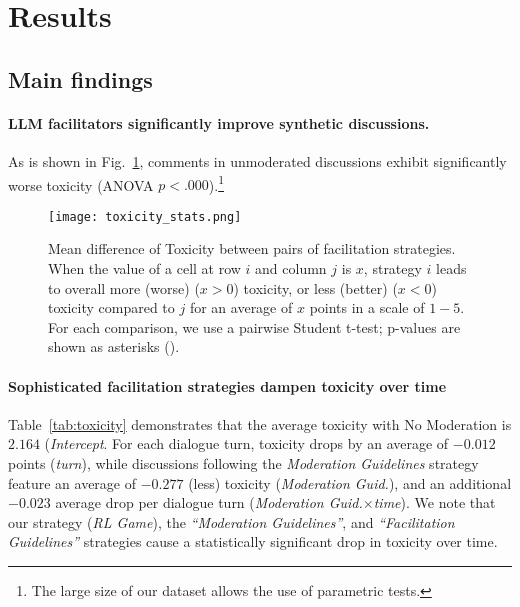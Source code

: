 %

\section{Results}
\label{sec:results}


\subsection{Main findings}

\paragraph{\ac{LLM} facilitators significantly improve synthetic discussions.} As is shown in Fig.~\ref{fig:toxicity_stats}, comments in unmoderated discussions exhibit significantly worse toxicity (ANOVA $p<.000$).\footnote{The large size of our dataset allows the use of parametric tests.} 

\begin{figure}
	\texttt{[image: toxicity\_stats.png]}
	\centering
	\caption{Mean difference of Toxicity between pairs of facilitation strategies. When the value of a cell at row $i$ and column $j$ is $x$, strategy $i$ leads to overall more (worse) ($x>0$) toxicity, or less (better) ($x<0$) toxicity compared to $j$ for an average of $x$ points in a scale of $1-5$. For each comparison, we use a pairwise Student t-test; p-values are shown as asterisks (\asterisknote).}
	\label{fig:toxicity_stats}
\end{figure}

\paragraph{Sophisticated facilitation strategies dampen toxicity over time} Table~\ref{tab:toxicity} demonstrates that the average toxicity with No Moderation is $2.164$ (\textit{Intercept}. For each dialogue turn, toxicity drops by an average of $-0.012$ points (\textit{turn}), while discussions following the \textit{Moderation Guidelines} strategy feature an average of  $-0.277$ (less) toxicity (\textit{Moderation Guid.}), and an additional $-0.023$ average drop per dialogue turn (\textit{Moderation Guid.}$\times$\textit{time}). We note that our strategy (\emph{RL Game}), the \emph{``Moderation Guidelines''}, and \emph{``Facilitation Guidelines''} strategies cause a statistically significant drop in toxicity over time.

